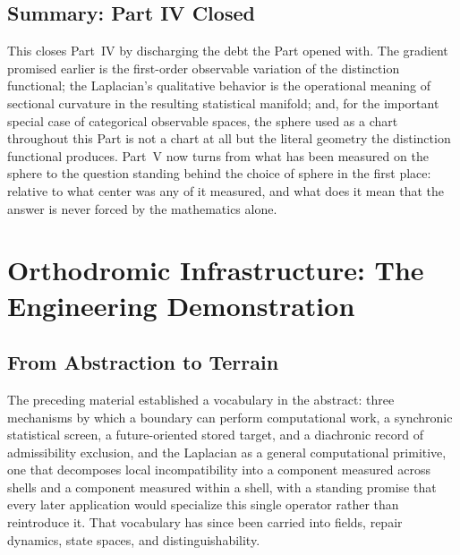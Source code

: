 \documentclass[11pt,fleqn]{book}
\numberwithin{equation}{chapter}
\theoremstyle{plain}
\theoremstyle{definition}
\theoremstyle{remark}
\providecommand{\Tset}{\mathcal{T}}
\begin{document}
\section{Summary: Part IV Closed}

This closes Part~IV by discharging the debt the Part opened with. The gradient promised earlier is the first-order observable variation of the distinction functional; the Laplacian's qualitative behavior is the operational meaning of sectional curvature in the resulting statistical manifold; and, for the important special case of categorical observable spaces, the sphere used as a chart throughout this Part is not a chart at all but the literal geometry the distinction functional produces. Part~V now turns from what has been measured on the sphere to the question standing behind the choice of sphere in the first place: relative to what center was any of it measured, and what does it mean that the answer is never forced by the mathematics alone.


\providecommand{\Tset}{\mathcal{T}}

\chapter{Orthodromic Infrastructure: The Engineering Demonstration}

\section{From Abstraction to Terrain}

The preceding material established a vocabulary in the abstract: three mechanisms by which a boundary can perform computational work, a synchronic statistical screen, a future-oriented stored target, and a diachronic record of admissibility exclusion, and the Laplacian as a general computational primitive, one that decomposes local incompatibility into a component measured across shells and a component measured within a shell, with a standing promise that every later application would specialize this single operator rather than reintroduce it. That vocabulary has since been carried into fields, repair dynamics, state spaces, and distinguishability.
\end{document}
